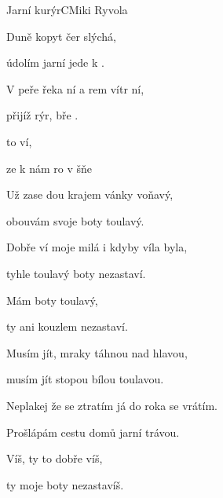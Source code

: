 \setcounter{page}{34}
\begin{song}{Jarní kurýr}{C}{Miki Ryvola}

\begin{SBVerse}

Duně kopyt čer slýchá,

údolím jarní  jede k .

V peře řeka ní a rem vítr ní,

přijíž rýr, bře  .

\end{SBVerse}

\begin{SBChorus}

  to ví,

ze k nám ro v šňe 

\end{SBChorus}

\begin{SBVerse}

Už zase dou krajem vánky voňavý,

obouvám svoje boty toulavý.

Dobře ví moje milá i kdyby víla byla,

tyhle toulavý boty nezastaví.

\end{SBVerse}

\begin{SBChorus}

Mám boty toulavý,

ty ani kouzlem nezastaví.

\end{SBChorus}

\begin{SBVerse}

Musím jít, mraky táhnou nad hlavou,

musím jít stopou bílou toulavou.

Neplakej že se ztratím já do roka se vrátím.

Prošlápám cestu domů jarní trávou.

\end{SBVerse}

\begin{SBChorus}

Víš, ty to dobře víš,

ty moje boty nezastavíš.

\end{SBChorus}

\end{song}

\clearpage
